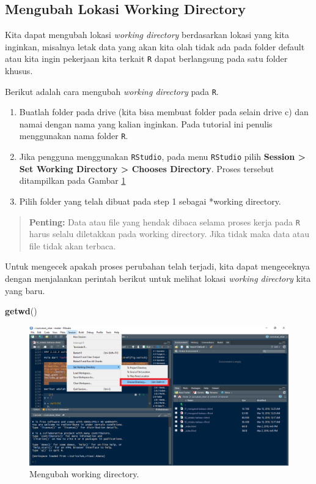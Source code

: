 \documentclass[
]{book}
\newenvironment{Shaded}{\begin{snugshade}}{\end{snugshade}}
\newcommand{\FunctionTok}[1]{\textcolor[rgb]{0.13,0.29,0.53}{\textbf{#1}}}
\newcommand{\NormalTok}[1]{#1}
\providecommand{\tightlist}{%
  \setlength{\itemsep}{0pt}\setlength{\parskip}{0pt}}
\theoremstyle{definition}
\theoremstyle{definition}
\theoremstyle{definition}
\theoremstyle{definition}
\theoremstyle{remark}
\begin{document}
\hypertarget{changewdR}{%
\subsection{Mengubah Lokasi Working Directory}\label{changewdR}}

Kita dapat mengubah lokasi \emph{working directory} berdasarkan lokasi yang kita inginkan, misalnya letak data yang akan kita olah tidak ada pada folder default atau kita ingin pekerjaan kita terkait \texttt{R} dapat berlangsung pada satu folder khusus.

Berikut adalah cara mengubah \emph{working directory} pada \texttt{R}.

\begin{enumerate}
\def\labelenumi{\arabic{enumi}.}
\tightlist
\item
  Buatlah folder pada drive (kita bisa membuat folder pada selain drive c) dan namai dengan nama yang kalian inginkan. Pada tutorial ini penulis menggunakan nama folder \texttt{R}.
\item
  Jika pengguna menggunakan \texttt{RStudio}, pada menu \texttt{RStudio} pilih \textbf{Session \textgreater{} Set Working Directory \textgreater{} Chooses Directory}. Proses tersebut ditampilkan pada Gambar \ref{fig:working}
\item
  Pilih folder yang telah dibuat pada step 1 sebagai *working directory.
\end{enumerate}

\begin{quote}
\textbf{Penting:} Data atau file yang hendak dibaca selama proses kerja pada \texttt{R} harus selalu diletakkan pada working directory. Jika tidak maka data atau file tidak akan terbaca.
\end{quote}

Untuk mengecek apakah proses perubahan telah terjadi, kita dapat mengeceknya dengan menjalankan perintah berikut untuk melihat lokasi \emph{working directory} kita yang baru.

\begin{Shaded}
\begin{Highlighting}[]
\FunctionTok{getwd}\NormalTok{()}
\end{Highlighting}
\end{Shaded}

\begin{figure}

{\centering \includegraphics[width=0.8\linewidth]{./images/working} 

}

\caption{Mengubah working directory.}\label{fig:working}
\end{figure}
\end{document}
